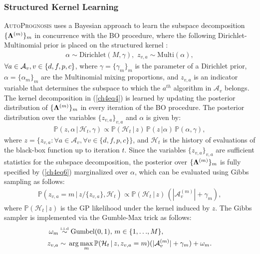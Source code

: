 \documentclass [PhD] {uclathes}
\begin{document}
\subsubsection{Structured Kernel Learning} %
{\footnotesize \textsc{AutoPrognosis}} uses a Bayesian approach to learn the subspace decomposition \mbox{\footnotesize $\{{\bf \Lambda}^{(m)}\}_m$} in concurrence with the BO procedure, where the following Dirichlet-Multinomial prior is placed on the structured kernel \cite{wang2017batched}: 
\begin{align}
\mbox{$\alpha \sim \mbox{Dirichlet}(M,\gamma),\,\, z_{v,a} \sim \mbox{Multi}(\alpha),$} 
\label{ch4eq6}
\end{align}
\mbox{\footnotesize $\forall a \in \mathcal{A}_v, {\tiny v \in \{d,f,p,c\}}$}, where \mbox{\footnotesize $\gamma = \{\gamma_m\}_m$} is the parameter of a Dirichlet prior, \mbox{\footnotesize $\alpha = \{\alpha_m\}_m$} are the Multinomial mixing proportions, and \mbox{\footnotesize $z_{v,a}$} is an indicator variable that determines the subspace to which the $a^{th}$ algorithm in \mbox{\footnotesize $\mathcal{A}_v$} belongs. The kernel decomposition in (\ref{ch4eq4}) is learned by updating the posterior distribution of \mbox{\footnotesize $\{{\bf \Lambda}^{(m)}\}_m$} in every iteration of the BO procedure. The posterior distribution over the variables \mbox{\footnotesize $\{z_{v,a}\}_{v,a}$} and \mbox{\footnotesize $\alpha$} is given by: 
\begin{align}
\mathbb{P}(z, \alpha\,|\,\mathcal{H}_t,\gamma) \propto \mathbb{P}(\mathcal{H}_t\,|\,z) \, \mathbb{P}(z\,|\alpha) \, \mathbb{P}(\alpha,\gamma),
\label{ch4eq7}
\end{align}
where \mbox{\footnotesize $z = \{z_{v,a}: \forall a \in \mathcal{A}_v, \forall v \in \{d,f,p,c\}\}$}, and \mbox{\footnotesize $\mathcal{H}_t$} is the history of evaluations of the black-box function up to iteration $t$. Since the variables \mbox{\footnotesize $\{z_{v,a}\}_{v,a}$} are sufficient statistics for the subspace decomposition, the posterior over \mbox{\footnotesize $\{{\bf \Lambda}^{(m)}\}_m$} is fully specified by (\ref{ch4eq6}) marginalized over \mbox{\footnotesize $\alpha$}, which can be evaluated using Gibbs sampling as follows:
\begin{align}
\mathbb{P}(z_{v,a} = m\,|\,z/\{z_{v,a}\},\mathcal{H}_t) \propto \mathbb{P}(\mathcal{H}_t\,|\,z) \, (|\mathcal{A}_v^{(m)}|+\gamma_{m}), \nonumber 
\end{align}
where \mbox{\footnotesize $\mathbb{P}(\mathcal{H}_t\,|\,z)$} is the GP likelihood under the kernel induced by \mbox{\footnotesize $z$}. The Gibbs sampler is implemented via the Gumble-Max trick \cite{maddison2014sampling} as follows:
\begin{align}
\omega_m & \overset{\mbox{\tiny i.i.d}}{\sim} \mbox{Gumbel}(0,1),\, m \in \{1,.\,.\,.,M\}, \label{ch4eq8}\\ 
z_{v,a} &\sim \, \arg \max_m \mathbb{P}(\mathcal{H}_t\,|\,z,z_{v,a} = m)(|\mathcal{A}_v^{(m)}|+\gamma_{m}) + \omega_m. \nonumber 
\end{align} 
\end{document}
